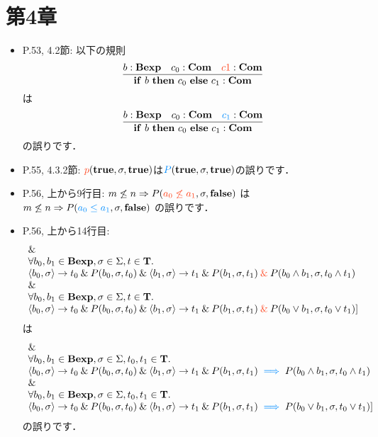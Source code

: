 \documentclass[12pt,titlepage,twoside,openright,dvipdfmx]{jsbook}
\newcommand\old[1]{%
  \textcolor[rgb]{1.0,0.25,0.1}{#1}%
  }
\newcommand\new[1]{%
  \textcolor[rgb]{0,0.55,1.0}{#1}%
  }
\theoremstyle{definition}
\begin{document}
\section*{第4章}

\begin{itemize}
  \ifnum {}
  \ifnum {}
  \item P.53, 4.2節: 以下の規則
  \[
    \infer
    {\mathbf{if}\ b\ \mathbf{then}\ c_0\ \mathbf{else}\ c_1:\mathbf{Com}}
    {b:\mathbf{Bexp} & c_0:\mathbf{Com} & \old{c1}:\mathbf{Com}}
  \]
  は
  \[
    \infer
    {\mathbf{if}\ b\ \mathbf{then}\ c_0\ \mathbf{else}\ c_1:\mathbf{Com}}
    {b:\mathbf{Bexp} & c_0:\mathbf{Com} & \new{c_1}:\mathbf{Com}}
  \]
  の誤りです．
\item P.55, 4.3.2節: $\old{p}(\Ttrue, \sigma,\Ttrue)$は$\new{P}(\Ttrue, \sigma, \Ttrue)$の誤りです．
\item P.56, 上から9行目:
  $m \not\le n \Rightarrow P(\old{a_0 \not\le a_1},\sigma,\mathbf{false})$
  は
  $m \not\le n \Rightarrow P(\new{a_0 \le a_1},\sigma,\mathbf{false})$
  の誤りです．
\item P.56, 上から14行目:
  \[
    \begin{array}{ll}
    \AND\\
    \forall{b_0,b_1\in\mathbf{Bexp},\sigma\in\Sigma,t\in\mathbf{T}}.\\
      \tuple{b_0,\sigma}\rightarrow t_0 \AND P(b_0,\sigma,t_0) \AND \tuple{b_1,\sigma}\rightarrow t_1 \AND P(b_1,\sigma,t_1) \old{{}\AND{}} P(b_0\wedge b_1,\sigma, t_0\wedge t_1)\\
      \AND\\
      \forall{b_0,b_1\in\mathbf{Bexp},\sigma\in\Sigma,t\in\mathbf{T}}.\\
      \tuple{b_0,\sigma}\rightarrow t_0 \AND P(b_0,\sigma,t_0) \AND \tuple{b_1,\sigma}\rightarrow t_1 \AND P(b_1,\sigma,t_1) \old{{}\AND{}} P(b_0\vee b_1,\sigma, t_0\vee t_1) \rbrack
    \end{array}
  \]
  は
  \[
    \begin{array}{ll}
    \AND\\
      \forall{b_0,b_1\in\mathbf{Bexp},\sigma\in\Sigma,t_0,t_1\in\mathbf{T}}.\\
      \tuple{b_0,\sigma}\rightarrow t_0 \AND P(b_0,\sigma,t_0) \AND \tuple{b_1,\sigma}\rightarrow t_1 \AND P(b_1,\sigma,t_1) \new{{}\implies{}} P(b_0\wedge b_1,\sigma, t_0\wedge t_1)\\
      \AND\\
      \forall{b_0,b_1\in\mathbf{Bexp},\sigma\in\Sigma,t_0,t_1\in\mathbf{T}}.\\
      \tuple{b_0,\sigma}\rightarrow t_0 \AND P(b_0,\sigma,t_0) \AND \tuple{b_1,\sigma}\rightarrow t_1 \AND P(b_1,\sigma,t_1) \new{{}\implies{}} P(b_0\vee b_1,\sigma, t_0\vee t_1) \rbrack
    \end{array}
  \]
  の誤りです．
  \fi
  \fi


\end{itemize}
\end{document}
